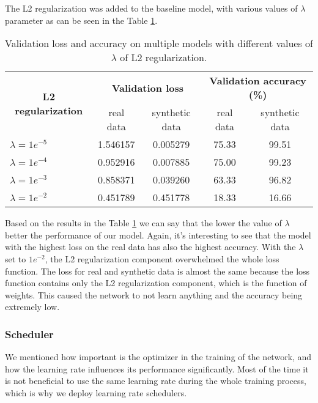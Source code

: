 The L2 regularization was added to the baseline model, with various values of $\lambda$ parameter as can be seen in the Table \ref{tab:regularization}. 

{\renewcommand{\arraystretch}{1.4}
\begin{table}[h]
\centering
\begin{tabular}{|l|cc|cc|}
\hline
\multicolumn{1}{|c|}{\multirow{2}{*}{\textbf{L2 regularization}}} & \multicolumn{2}{c|}{\textbf{Validation loss}} & \multicolumn{2}{c|}{\textbf{Validation accuracy (\%)}} \\ \cline{2-5} 
\multicolumn{1}{|c|}{} & \multicolumn{1}{c|}{real data} & synthetic data & \multicolumn{1}{c|}{real data} & synthetic data \\ \hline
\textit{$\lambda = 1e^{-5}$} & \multicolumn{1}{c|}{1.546157} & 0.005279 & \multicolumn{1}{c|}{75.33} & 99.51 \\ \hline
\textit{$\lambda = 1e^{-4}$} & \multicolumn{1}{c|}{0.952916} & 0.007885 & \multicolumn{1}{c|}{75.00} & 99.23 \\ \hline
\textit{$\lambda = 1e^{-3}$} & \multicolumn{1}{c|}{0.858371} & 0.039260 & \multicolumn{1}{c|}{63.33} & 96.82 \\ \hline
\textit{$\lambda = 1e^{-2}$} & \multicolumn{1}{c|}{0.451789} & 0.451778 & \multicolumn{1}{c|}{18.33} & 16.66 \\ \hline
\end{tabular}
\caption{Validation loss and accuracy on multiple models with different values of $\lambda$ of L2 regularization.}
\label{tab:regularization}
\end{table}
}

Based on the results in the Table \ref{tab:regularization} we can say that the lower the value of $\lambda$ better the performance of our model. Again, it's interesting to see that the model with the highest loss on the real data has also the highest accuracy. With the $\lambda$ set to $1e^{-2}$, the L2 regularization component overwhelmed the whole loss function. The loss for real and synthetic data is almost the same because the loss function contains only the L2 regularization component, which is the function of weights. This caused the network to not learn anything and the accuracy being extremely low. 

\subsubsection{Scheduler}

We mentioned how important is the optimizer in the training of the network, and how the learning rate influences its performance significantly. Most of the time it is not beneficial to use the same learning rate during the whole training process, which is why we deploy learning rate schedulers. 

